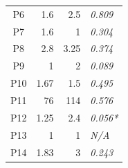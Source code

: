 \begin{table}[]
\begin{tabular}{crrl}
P6                                       & 1.6                                                                                                          & 2.5                                                                                                             & \textit{0.809}                                \\
P7                                       & 1.6                                                                                                          & 1                                                                                                               & \textit{0.304}                               \\
P8                                       & 2.8                                                                                                          & 3.25                                                                                                            & \textit{0.374}                               \\
P9                                       & 1                                                                                                            & 2                                                                                                               & \textit{0.089}                              \\
P10                                      & 1.67                                                                                                         & 1.5                                                                                                             & \textit{0.495}                                \\
P11                                      & 76                                                                                                           & 114                                                                                                             & \textit{0.576 }                              \\
P12                                      & 1.25                                                                                                         & 2.4                                                                                                             & \textit{0.056*}                             \\
P13                                      & 1                                                                                                            & 1                                                                                                               & \textit{N/A}                                  \\
P14                                      & 1.83                                                                                                         & 3                                                                                                               & \textit{0.243}  
            \\
\bottomrule
\end{tabular}
\end{table}

